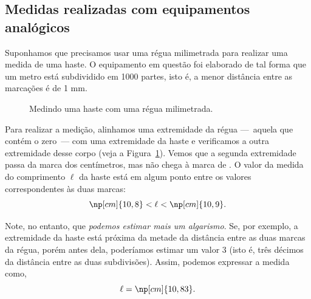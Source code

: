 \subsection{Medidas realizadas com equipamentos analógicos}
\label{Sec:MedEquipAnalog}

Suponhamos que precisamos usar uma régua milimetrada para realizar uma medida de uma haste. O equipamento em questão foi elaborado de tal forma que um metro está subdividido em 1000 partes, isto é, a menor distância entre as marcações é de 1 mm.

\begin{figure}[!hb]
\centering
{}
\caption{Medindo uma haste com uma régua milimetrada.\label{Fig:MedindoHasteComUmaRegua}}
\end{figure}

Para realizar a medição, alinhamos uma extremidade da régua ---~aquela que contém o zero~--- com uma extremidade da haste e verificamos a outra extremidade desse corpo (veja a Figura~\ref{Fig:MedindoHasteComUmaRegua}). Vemos que a segunda extremidade passa da marca dos  centímetros, mas não chega à marca de . O valor da medida do comprimento $\ell$ da haste está em algum ponto entre os valores correspondentes às duas marcas:
\begin{equation}
     \np[cm]{10,8} < \ell < \np[cm]{10,9}.
\end{equation}

\noindent{}Note, no entanto, que \emph{podemos estimar mais um algarismo}. Se, por exemplo, a extremidade da haste está próxima da metade da distância entre as duas marcas da régua, porém antes dela, poderíamos estimar um valor 3 (isto é, três décimos da distância entre as duas subdivisões). Assim, podemos expressar a medida como,
\begin{equation}
     \ell = \np[cm]{10,83}.
\end{equation}

